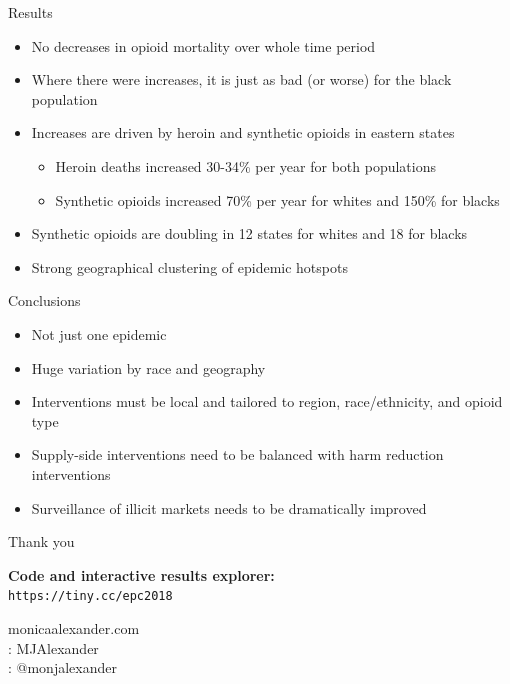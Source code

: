 \documentclass[ignorenonframetext,compress]{beamer}
\providecommand{\tightlist}{%
  \setlength{\itemsep}{0pt}\setlength{\parskip}{0pt}}
\begin{document}
\begin{frame}{Results}

\begin{itemize}
\tightlist
\item
  No decreases in opioid mortality over whole time period
\item
  Where there were increases, it is just as bad (or worse) for the black
  population
\item
  Increases are driven by heroin and synthetic opioids in eastern states

  \begin{itemize}
  \tightlist
  \item
    Heroin deaths increased 30-34\% per year for both populations
  \item
    Synthetic opioids increased 70\% per year for whites and 150\% for
    blacks
  \end{itemize}
\item
  Synthetic opioids are doubling in 12 states for whites and 18 for
  blacks
\item
  Strong geographical clustering of epidemic hotspots
\end{itemize}

\end{frame}

\begin{frame}{Conclusions}

\begin{itemize}
\tightlist
\item
  Not just one epidemic
\item
  Huge variation by race and geography
\item
  Interventions must be local and tailored to region, race/ethnicity,
  and opioid type
\item
  Supply-side interventions need to be balanced with harm reduction
  interventions 
\item
  Surveillance of illicit markets needs to be dramatically improved 
\end{itemize}

\end{frame}

\begin{frame}{Thank you}

\Large

\begin{center}
\textbf{Code and interactive results explorer:} \\ \texttt{https://tiny.cc/epc2018} \newline \newline

 monicaalexander.com \\
\faGithub: MJAlexander \\
\faTwitter: @monjalexander

\end{center}

\end{frame}
\end{document}
